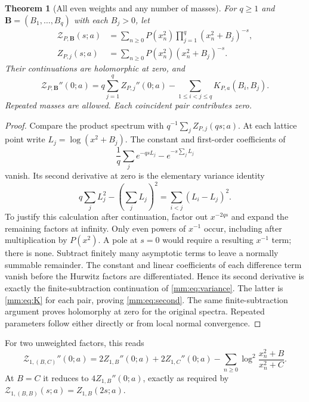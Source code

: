 \documentclass[11pt,a4paper]{article}
\numberwithin{equation}{section}
\newtheorem{theorem}{Theorem}[section]
\theoremstyle{definition}
\theoremstyle{remark}
\begin{document}
\begin{theorem}[All even weights and any number of masses]
\label{mm:thm:second}
For $q\ge1$ and $\mathbf B=(B_1,\ldots,B_q)$ with each $B_j>0$,
let
\begin{align}
 \mathcal Z_{P,\mathbf B}(s;a)
 &=\sum_{n\ge0}P(x_n^2)\prod_{j=1}^{q}(x_n^2+B_j)^{-s},
 \label{mm:eq:product}\\
 Z_{P,j}(s;a)&=\sum_{n\ge0}P(x_n^2)(x_n^2+B_j)^{-s}.
 \label{mm:eq:individual}
\end{align}
Their continuations are holomorphic at zero, and
\begin{equation}\label{mm:eq:second}
 \boxed{\displaystyle
 \mathcal Z_{P,\mathbf B}''(0;a)
 =q\sum_{j=1}^{q}Z_{P,j}''(0;a)
             -\sum_{1\le i<j\le q}K_{P,a}(B_i,B_j).}
\end{equation}
Repeated masses are allowed.  Each coincident pair contributes zero.
\end{theorem}
\begin{proof}
Compare the product spectrum with
$q^{-1}\sum_jZ_{P,j}(qs;a)$.  At each lattice point write
$L_j=\log(x^2+B_j)$.  The constant and first-order coefficients of
\[
 \frac1q\sum_j e^{-qsL_j}-e^{-s\sum_jL_j}
\]
vanish.  Its second derivative at zero is the elementary variance
identity
\begin{equation}\label{mm:eq:variance}
 q\sum_jL_j^2-\left(\sum_jL_j\right)^2
                =\sum_{i<j}(L_i-L_j)^2.
\end{equation}
To justify this calculation after continuation, factor out $x^{-2qs}$
and expand the remaining factors at infinity.  Only even powers of
$x^{-1}$ occur, including after multiplication by $P(x^2)$.  A pole
at $s=0$ would require a resulting $x^{-1}$ term; there is none.
Subtract finitely many asymptotic terms to leave a normally summable
remainder.  The constant and linear coefficients of each difference
term vanish before the Hurwitz factors are differentiated.  Hence its
second derivative is exactly the finite-subtraction continuation of
\eqref{mm:eq:variance}.  The latter is
\eqref{mm:eq:K} for each pair, proving \eqref{mm:eq:second}.
The same finite-subtraction argument proves holomorphy at zero for
the original spectra.  Repeated parameters follow either directly
or from local normal convergence.
\end{proof}

For two unweighted factors, this reads
\[
 \mathcal Z_{1,(B,C)}''(0;a)
 =2Z_{1,B}''(0;a)+2Z_{1,C}''(0;a)
       -\sum_{n\ge0}\log^2\frac{x_n^2+B}{x_n^2+C}.
\]
At $B=C$ it reduces to $4Z_{1,B}''(0;a)$, exactly as required by
$\mathcal Z_{1,(B,B)}(s;a)=Z_{1,B}(2s;a)$.
\end{document}
